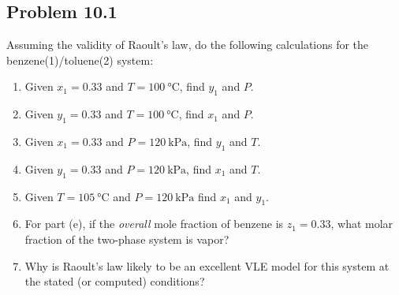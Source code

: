 \documentclass{article}
\begin{document}
\tableofcontents


\subsection*{Problem 10.1}
Assuming the validity of Raoult's law, do the following calculations
for the benzene(1)/toluene(2) system:
\begin{enumerate}[label=(\alph*)]
  \item Given $x_{1} = 0.33$ and $T=100~\unit{\degreeCelsius}$, find
    $y_{1}$ and $P$.
  \item Given $y_{1} = 0.33$ and $T=100~\unit{\degreeCelsius}$, find
    $x_{1}$ and $P$.
  \item Given $x_{1} = 0.33$ and $P=120~\unit{\kilo\pascal}$, find
    $y_{1}$ and $T$.
  \item Given $y_{1} = 0.33$ and $P=120~\unit{\kilo\pascal}$, find
    $x_{1}$ and $T$.
  \item Given $T=105~\unit{\degreeCelsius}$ and
    $P=120~\unit{\kilo\pascal}$ find $x_{1}$ and $y_{1}$.
  \item For part (e), if the \textit{overall} mole fraction of
    benzene is $z_{1}=0.33$, what molar fraction of the two-phase
    system is vapor?
  \item Why is Raoult's law likely to be an excellent VLE model for
    this system at the stated (or computed) conditions?
\end{enumerate}
\end{document}
